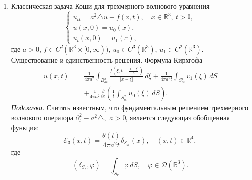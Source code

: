 \documentclass[unicode,12pt,draft]{article}
\begin{document}
\begin{enumerate}
\item
Классическая задача Коши для трехмерного волнового уравнения
$$
    \left\{
        \begin{array}{l}
            u_{tt} = a^2 \triangle u + f (x, t),
            \quad
            x \in {\mathbb R}^3,
            \:
            t > 0,
            \\
            u (x, 0) = u_0 (x),
            \\
            u_t (x, 0) = u_1 (x),
        \end{array}
    \right.
$$
где $a > 0$, $f \in C^2 ({\mathbb R}^3 \times [0, \infty))$, $u_0
\in C^3 ({\mathbb R}^3)$, $u_1 \in C^2 ({\mathbb R}^3)$.
Существование и единственность решения. Формула Кирхгофа
\begin{align*}
    u (x, t)
    =
    {}
    &
    \frac{
        1
    }{
        4
        \pi
        a^2
    }
    \int_{
        B_{at}^x
    }
    \frac{
        f
        \left(
            \xi,
            t
            - \frac{
            |x - \xi|
            }{
                a
            }
        \right)
    }{
        |x - \xi|
    }
    \,
    d\xi
    +
    \frac{
        1
    }{
        4
        \pi
        a^2
        t
    }
    \int_{
        S_{at}^x
    }
    u_1 (\xi)
    \,
    dS
    \\
    &
    +
        \frac{
            1
        }{
            4
            \pi
            a^2
        }
    \frac{\partial}{\partial t}
    \left(
        \frac{
            1
        }{
            t
        }
        \int_{
            S_{at}^x
        }
        u_0 (\xi)
        \,
        dS
    \right).
\end{align*}
{\it Подсказка.} Считать известным, что фундаментальным решением
трехмерного волнового оператора $
    \partial_t^2 - a^2 \triangle,
$ $a > 0$, является следующая обобщенная функция:
$$
    {\mathcal E}_3 (x, t)
    =
    \frac{
        \theta (t)
    }{
        4
        \pi
        a^2
        t
    }
    \delta_{
        S_{at}
    }
     (x),
    \quad
    (x, t)
    \in
    {\mathbb R}^4,
$$
где
$$
    (\delta_{S_r}, \varphi)
    =
    \int_{
        S_r
    }
    \varphi
    \,
    dS,
    \quad
    \varphi \in {\mathcal D} ({\mathbb R}^3).
$$



\end{enumerate}
\end{document}
